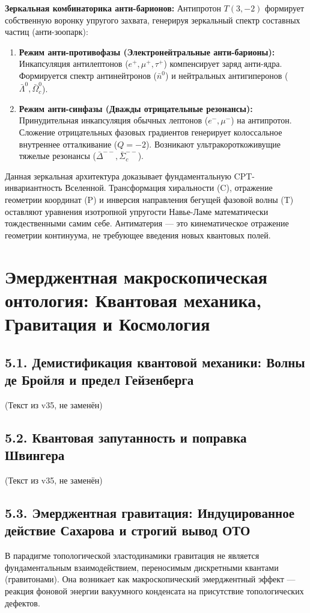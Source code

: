 \documentclass[11pt,a4paper]{article}
\begin{document}
	\textbf{Зеркальная комбинаторика анти-барионов:}
	Антипротон $T(3,-2)$ формирует собственную воронку упругого захвата, генерируя зеркальный спектр составных частиц (анти-зоопарк):
	\begin{enumerate}
		\item \textbf{Режим анти-противофазы (Электронейтральные анти-барионы):} Инкапсуляция антилептонов ($e^+, \mu^+, \tau^+$) компенсирует заряд анти-ядра. Формируется спектр антинейтронов ($\bar{n}^0$) и нейтральных антигиперонов ($\bar{\Lambda}^0, \bar{\Omega}_c^0$).
		\item \textbf{Режим анти-синфазы (Дважды отрицательные резонансы):} Принудительная инкапсуляция обычных лептонов ($e^-, \mu^-$) на антипротон. Сложение отрицательных фазовых градиентов генерирует колоссальное внутреннее отталкивание ($Q=-2$). Возникают ультракороткоживущие тяжелые резонансы ($\bar{\Delta}^{--}, \bar{\Sigma}_c^{--}$).
	\end{enumerate}
	
	Данная зеркальная архитектура доказывает фундаментальную CPT-инвариантность Вселенной. Трансформация хиральности (C), отражение геометрии координат (P) и инверсия направления бегущей фазовой волны (T) оставляют уравнения изотропной упругости Навье-Ламе математически тождественными самим себе. Антиматерия — это кинематическое отражение геометрии континуума, не требующее введения новых квантовых полей.
	
	\section{Эмерджентная макроскопическая онтология: Квантовая механика, Гравитация и Космология}
	
	\subsection{5.1. Демистификация квантовой механики: Волны де Бройля и предел Гейзенберга}
	(Текст из v35, не заменён)
	
	\subsection{5.2. Квантовая запутанность и поправка Швингера}
	(Текст из v35, не заменён)
	
	\subsection{5.3. Эмерджентная гравитация: Индуцированное действие Сахарова и строгий вывод ОТО}
	В парадигме топологической эластодинамики гравитация не является фундаментальным взаимодействием, переносимым дискретными квантами (гравитонами). Она возникает как макроскопический эмерджентный эффект — реакция фоновой энергии вакуумного конденсата на присутствие топологических дефектов.
	
\end{document}
